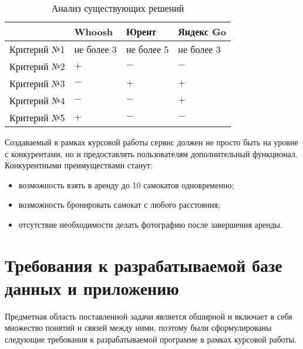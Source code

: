 \begin{table}[H]
    \caption{Анализ существующих решений}
    \label{tbl:comparison}
    {\renewcommand{\arraystretch}{1.2}
    \begin{tabularx}{\textwidth} 
        {
            | >{\raggedright\arraybackslash}X 
            | >{\centering\arraybackslash}X 
            | >{\centering\arraybackslash}X 
            | >{\centering\arraybackslash}X |
        }
        \hline
        & \textbf{Whoosh} & \textbf{Юрент} & \textbf{Яндекс Go}\\
        \hline
        Критерий №1 & не более 3 & не более 5 & не более 3\\
        \hline
        Критерий №2 & $+$ & $-$ & $-$\\
        \hline
        Критерий №3 & $-$ & $+$ & $+$\\
        \hline
        Критерий №4 & $-$ & $-$ & $+$\\
        \hline
        Критерий №5 & $+$ & $-$ & $-$\\
        \hline
    \end{tabularx}}
\end{table}

Создаваемый в рамках курсовой работы сервис должен не просто быть на уровне с конкурентами, но и предоставлять пользователям дополнительный функционал. Конкурентными преимуществами станут:

\begin{itemize}
    \item возможность взять в аренду до 10 самокатов одновременно;
    \item возможность бронировать самокат с любого расстояния;
    \item отсутствие необходимости делать фотографию после завершения аренды.
\end{itemize}

\section{Требования к разрабатываемой базе данных и приложению}

Предметная область поставленной задачи является обширной и включает в себя множество понятий и связей между ними, поэтому были сформулированы следующие требования к разрабатываемой программе в рамках курсовой работы.

